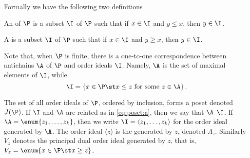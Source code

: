 Formally we have the following two definitions
\begin{definition}
An  of $\P$ is a subset $\I$ of $\P$ such that if $x \in
\I$ and $y \le x$, then $y \in \I$.
\end{definition}
\begin{definition}
A  is a subset $\I$ of $\P$ such that if $x \in \I$
and $y \ge x$, then $y \in \I$.
\end{definition}

Note that, when $\P$ is finite, there is a one-to-one correspondence between
antichains $\A$ of $\P$ and order ideals $\I$. Namely, $\A$ is the set of maximal
elements of $\I$, while
\begin{equation}
\label{eq:poset:a}
\I = \left\{{x \in \P \st x \le z ~\text{for some}~ z \in \A}\right\}.
\end{equation}

The set of all order ideals of $\P$, ordered by inclusion, forms a poset denoted
$J(\P)$. If $\I$ and $\A$ are related as in \ref{eq:poset:a}, then we say that $\A$
 $\I$. If $\A = \enum{z_1 , \ldots , z_k}$, then we
write $\I = \langle z_1 , \ldots , z_k \rangle$ for the order ideal generated by
$\A$. The order ideal $\langle z \rangle$ is the 
generated by $z$, denoted $\Lambda_z$. Similarly $V_z$ denotes the principal
dual order ideal generated by $z$, that is, $V_z = \enum{x \in \P \st x \ge
z}$.

